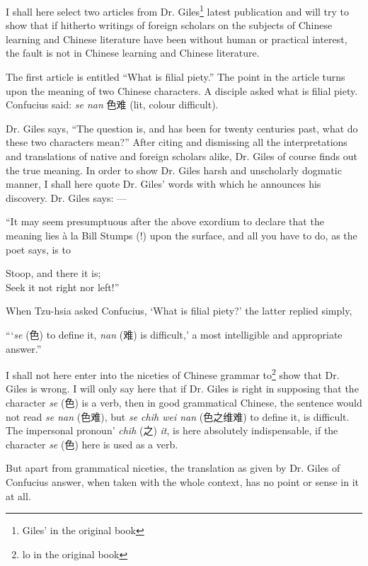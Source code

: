 I shall here select two articles from Dr. Giles\footnote{Giles' in the original book} latest publication and will try to show that if hitherto writings of foreign scholars on the subjects of Chinese learning and Chinese literature have been without human or practical interest, the fault is not in Chinese learning and Chinese literature.

The first article is entitled ``What is filial piety.''
The point in the article turns upon the meaning of two Chinese characters.
A disciple asked what is filial piety.
Confucius said: \emph{se nan} 色难 (lit, colour difficult).

Dr. Giles says, ``The question is, and has been for twenty centuries past, what do these two characters mean?''
After citing and dismissing all the interpretations and translations of native and foreign scholars alike, Dr. Giles of course finds out the true meaning.
In order to show Dr. Giles harsh and unscholarly dogmatic manner, I shall here quote Dr. Giles' words with which he announces his discovery. Dr. Giles says: ---

``It may seem presumptuous after the above exordium to declare that the meaning lies \`a la Bill Stumps (!) upon the surface, and all you have to do, as the poet says, is to
\begin{center}
    Stoop, and there it is; \\
    Seek it not right nor left!''
\end{center}

When Tzu-hsia asked Confucius, `What is filial piety?' the latter replied simply,

``\thinspace`\emph{se} (色) to define it, \emph{nan} (难) is difficult,' a most intelligible and appropriate answer.''

I shall not here enter into the niceties of Chinese grammar to\footnote{lo in the original book} show that Dr. Giles is wrong.
I will only say here that if Dr. Giles is right in supposing that the character \emph{se} (色) is a verb, then in good grammatical Chinese, the sentence would not read \emph{se nan} (色难), but \emph{se chih wei nan} (色之维难) to define it, is difficult.
The impersonal pronoun' \emph{chih} (之) \emph{it}, is here absolutely indispensable, if the character \emph{se} (色) here is used as a verb.

But apart from grammatical niceties, the translation as given by Dr. Giles of Confucius answer, when taken with the whole context, has no point or sense in it at all.

